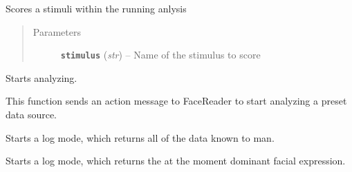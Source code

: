 \documentclass[letterpaper,10pt,english]{sphinxmanual}
\begin{document}
\begin{fulllineitems}
\begin{fulllineitems}
\end{fulllineitems}


\begin{fulllineitems}
\label{_static/facereader:FaceReader.FaceReader.score_stimulus}
Scores a stimuli within the running anlysis
\begin{quote}\begin{description}
\item[{Parameters}] \leavevmode
\textbf{\texttt{stimulus}} (\emph{str}) -- Name of the stimulus to score

\end{description}\end{quote}

\end{fulllineitems}


\begin{fulllineitems}
\label{_static/facereader:FaceReader.FaceReader.start_analyzing}
Starts analyzing.

This function sends an action message to FaceReader to start analyzing a preset data source.

\end{fulllineitems}


\begin{fulllineitems}
\label{_static/facereader:FaceReader.FaceReader.start_detailed_log}
Starts a log mode, which returns all of the data known to man.

\end{fulllineitems}


\begin{fulllineitems}
\label{_static/facereader:FaceReader.FaceReader.start_state_log}
Starts a log mode, which returns the at the moment dominant facial expression.

\end{fulllineitems}


\end{fulllineitems}
\end{document}
